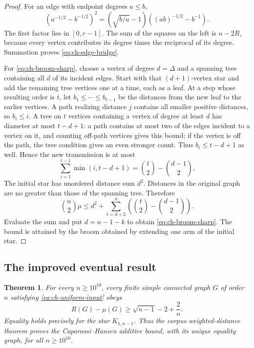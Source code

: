 \documentclass[11pt,a4paper]{article}
\newtheorem{theorem}{Theorem}[section]
\theoremstyle{definition}
\theoremstyle{remark}
\numberwithin{equation}{section}
\begin{document}
\begin{proof}
For an edge with endpoint degrees $a\le b$,
\[
 (a^{-1/2}-b^{-1/2})^2
   =\left(\sqrt{b/a}-1\right)
      \left((ab)^{-1/2}-b^{-1}\right).
\]
The first factor lies in $[0,r-1]$. The sum of the squares on the left is
$n-2R$, because every vertex contributes its degree times the reciprocal
of its degree. Summation proves \eqref{eq:ch-edge-bridge}.

For \eqref{eq:ch-broom-sharp}, choose a vertex of degree $d=\Delta$ and a
spanning tree containing all $d$ of its incident edges. Start with that
$(d+1)$-vertex star and add the remaining tree vertices one at a time, each
as a leaf. At a step whose resulting order is $t$, let
$b_1\le\cdots\le b_{t-1}$ be the distances from the new leaf to the earlier
vertices. A path realizing distance $j$ contains all smaller positive
distances, so $b_i\le i$. A tree on $t$ vertices containing a vertex of
degree at least $d$ has diameter at most $t-d+1$: a path contains at most
two of the edges incident to a vertex on it, and counting off-path vertices
gives this bound; if the vertex is off the path, the tree condition gives
an even stronger count. Thus $b_i\le t-d+1$ as well. Hence the new
transmission is at most
\[
 \sum_{i=1}^{t-1}\min(i,t-d+1)
      =\binom t2-\binom{d-1}{2}.
\]
The initial star has unordered distance sum $d^2$. Distances in the original
graph are no greater than those of the spanning tree. Therefore
\[
 \binom n2\mu
 \le d^2+\sum_{t=d+2}^{n}
                  \left(\binom t2-\binom{d-1}{2}\right).
\]
Evaluate the sum and put $d=n-1-k$ to obtain
\eqref{eq:ch-broom-sharp}. The bound is attained by the broom obtained by
extending one arm of the initial star.
\end{proof}

\subsection{The improved eventual result}

\begin{theorem}\label{thm:ch-cutoff-ten-billion}
For every $n\ge10^{10}$, every finite simple connected graph $G$ of order
$n$ satisfying \eqref{eq:ch-uniform-input} obeys
\[
 R(G)-\mu(G)\ge\sqrt{n-1}-2+\frac2n.
\]
Equality holds precisely for the star $K_{1,n-1}$. Thus the corpus
weighted-distance theorem proves the Caporossi--Hansen additive bound, with
its unique equality graph, for all $n\ge10^{10}$.
\end{theorem}
\end{document}
